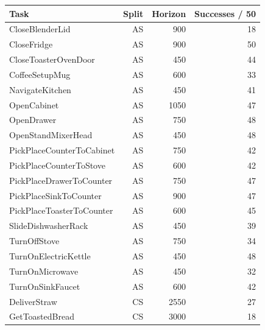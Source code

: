 \documentclass[10pt,twocolumn,letterpaper]{article}
\begin{document}
\small\begin{longtable}{@{}p{}rrr@{}}\toprule

Task & Split & Horizon & Successes / 50\\\midrule\endhead

CloseBlenderLid & AS & 900 & 18\\

CloseFridge & AS & 900 & 50\\

CloseToasterOvenDoor & AS & 450 & 44\\

CoffeeSetupMug & AS & 600 & 33\\

NavigateKitchen & AS & 450 & 41\\

OpenCabinet & AS & 1050 & 47\\

OpenDrawer & AS & 750 & 48\\

OpenStandMixerHead & AS & 450 & 48\\

PickPlaceCounterToCabinet & AS & 750 & 42\\

PickPlaceCounterToStove & AS & 600 & 42\\

PickPlaceDrawerToCounter & AS & 750 & 47\\

PickPlaceSinkToCounter & AS & 900 & 47\\

PickPlaceToasterToCounter & AS & 600 & 45\\

SlideDishwasherRack & AS & 450 & 39\\

TurnOffStove & AS & 750 & 34\\

TurnOnElectricKettle & AS & 450 & 48\\

TurnOnMicrowave & AS & 450 & 32\\

TurnOnSinkFaucet & AS & 600 & 42\\

DeliverStraw & CS & 2550 & 27\\

GetToastedBread & CS & 3000 & 18\\


\end{longtable}
\end{document}
